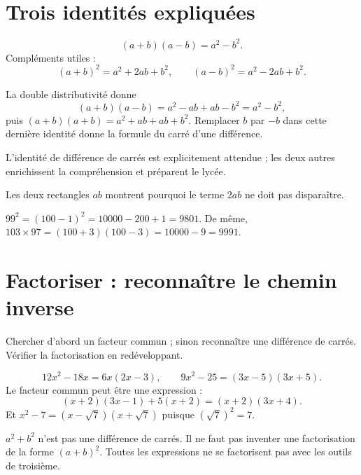 \documentclass[../cours_3e.tex]{subfiles}
\begin{document}
\section{Trois identités expliquées}
\begin{propriete}
\[
(a+b)(a-b)=a^2-b^2.
\]
Compléments utiles :
\[
(a+b)^2=a^2+2ab+b^2,\qquad
(a-b)^2=a^2-2ab+b^2.
\]
\end{propriete}
\begin{demonstration}
La double distributivité donne
\[
(a+b)(a-b)=a^2-ab+ab-b^2=a^2-b^2,
\]
puis $(a+b)(a+b)=a^2+ab+ab+b^2$. Remplacer $b$ par $-b$ dans cette dernière identité donne la formule du carré d'une différence.
\end{demonstration}
L'identité de différence de carrés est explicitement attendue ; les deux autres enrichissent la compréhension et préparent le lycée.
\begin{center}
\end{center}
Les deux rectangles $ab$ montrent pourquoi le terme $2ab$ ne doit pas disparaître.
\begin{exemple}
$99^2=(100-1)^2=10000-200+1=9801$. De même, $103\times97=(100+3)(100-3)=10000-9=9991$.
\end{exemple}
\section{Factoriser : reconnaître le chemin inverse}
\begin{methode}
Chercher d'abord un facteur commun ; sinon reconnaître une différence de carrés. Vérifier la factorisation en redéveloppant.
\end{methode}
\begin{exemple}
\[
12x^2-18x=6x(2x-3),\qquad
9x^2-25=(3x-5)(3x+5).
\]
Le facteur commun peut être une expression :
\[
(x+2)(3x-1)+5(x+2)=(x+2)(3x+4).
\]
Et $x^2-7=(x-\sqrt7)(x+\sqrt7)$ puisque $(\sqrt7)^2=7$.
\end{exemple}
\begin{attention}
$a^2+b^2$ n'est pas une différence de carrés. Il ne faut pas inventer une factorisation de la forme $(a+b)^2$. Toutes les expressions ne se factorisent pas avec les outils de troisième.
\end{attention}
\end{document}
